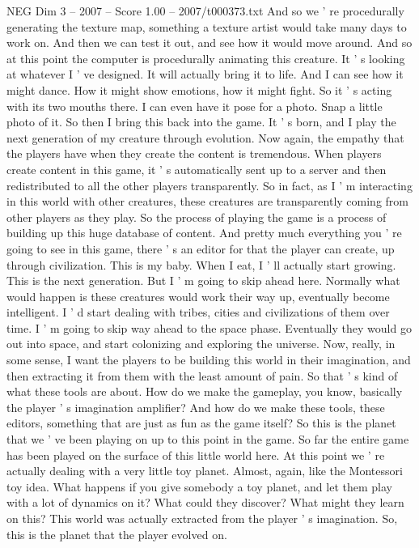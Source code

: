 \begin{textsample}{NEG Dim 3 – 2007 – Score 1.00 – 2007/t000373.txt}
And so we ' re procedurally generating the texture map, something a texture artist would take many days to work on.
And then we can test it out, and see how it would move around.
And so at this point the computer is procedurally animating this creature.
It ' s looking at whatever I ' ve designed.
It will actually bring it to life.
And I can see how it might dance.
How it might show emotions, how it might fight.
So it ' s acting with its two mouths there.
I can even have it pose for a photo.
Snap a little photo of it.
So then I bring this back into the game.
It ' s born, and I play the next generation of my creature through evolution.
Now again, the empathy that the players have when they create the content is tremendous.
When players create content in this game, it ' s automatically sent up to a server and then redistributed to all the other players transparently.
So in fact, as I ' m interacting in this world with other creatures, these creatures are transparently coming from other players as they play.
So the process of playing the game is a process of building up this huge database of content.
And pretty much everything you ' re going to see in this game, there ' s an editor for that the player can create, up through civilization.
This is my baby.
When I eat, I ' ll actually start growing.
This is the next generation.
But I ' m going to skip ahead here.
Normally what would happen is these creatures would work their way up, eventually become intelligent.
I ' d start dealing with tribes, cities and civilizations of them over time.
I ' m going to skip way ahead to the space phase.
Eventually they would go out into space, and start colonizing and exploring the universe.
Now, really, in some sense, I want the players to be building this world in their imagination, and then extracting it from them with the least amount of pain.
So that ' s kind of what these tools are about.
How do we make the gameplay, you know, basically the player ' s imagination amplifier?
And how do we make these tools, these editors, something that are just as fun as the game itself?
So this is the planet that we ' ve been playing on up to this point in the game.
So far the entire game has been played on the surface of this little world here.
At this point we ' re actually dealing with a very little toy planet.
Almost, again, like the Montessori toy idea.
What happens if you give somebody a toy planet, and let them play with a lot of dynamics on it?
What could they discover?
What might they learn on this?
This world was actually extracted from the player ' s imagination.
So, this is the planet that the player evolved on.

\end{textsample}
